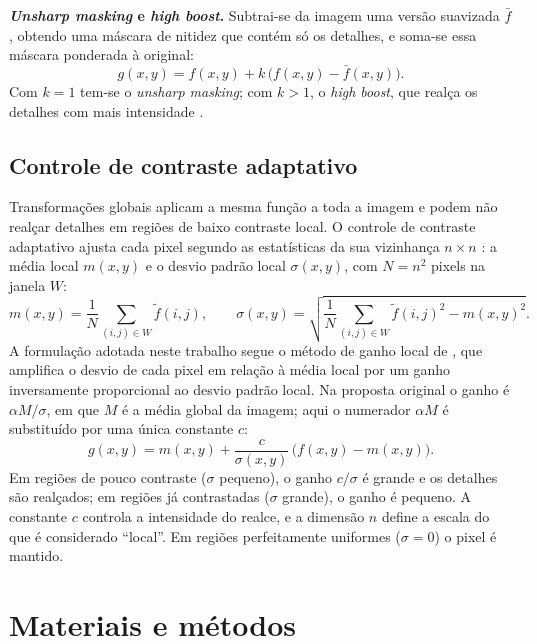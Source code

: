 \documentclass[11pt,a4paper]{article}
\begin{document}
\textbf{\textit{Unsharp masking} e \textit{high boost}.} Subtrai-se da imagem uma versão
suavizada $\bar f$, obtendo uma máscara de nitidez que contém só os detalhes, e soma-se essa
máscara ponderada à original:
\begin{equation}
  g(x, y) = f(x, y) + k\,\big(f(x, y) - \bar f(x, y)\big).
\end{equation}
Com $k = 1$ tem-se o \textit{unsharp masking}; com $k > 1$, o \textit{high boost}, que
realça os detalhes com mais intensidade \cite{gonzalez}.

\subsection{Controle de contraste adaptativo}

Transformações globais aplicam a mesma função a toda a imagem e podem não realçar detalhes
em regiões de baixo contraste local. O controle de contraste adaptativo ajusta cada pixel
segundo as estatísticas da sua vizinhança $n \times n$ \cite{gonzalez}: a média local
$m(x,y)$ e o desvio padrão local $\sigma(x,y)$, com $N = n^2$ pixels na janela $W$:
\begin{equation}
  m(x, y) = \frac{1}{N} \sum_{(i,j) \in W} \tilde f(i, j), \qquad
  \sigma(x, y) = \sqrt{\frac{1}{N} \sum_{(i,j) \in W} \tilde f(i, j)^2 - m(x, y)^2}.
\end{equation}
A formulação adotada neste trabalho segue o método de ganho local de \cite{narendra}, que
amplifica o desvio de cada pixel em relação à média local por um ganho inversamente
proporcional ao desvio padrão local. Na proposta original o ganho é $\alpha M / \sigma$, em que
$M$ é a média global da imagem; aqui o numerador $\alpha M$ é substituído por uma única
constante $c$:
\begin{equation}
  g(x, y) = m(x, y) + \frac{c}{\sigma(x, y)}\,\big(f(x, y) - m(x, y)\big).
\end{equation}
Em regiões de pouco contraste ($\sigma$ pequeno), o ganho $c/\sigma$ é grande e os detalhes
são realçados; em regiões já contrastadas ($\sigma$ grande), o ganho é pequeno. A constante
$c$ controla a intensidade do realce, e a dimensão $n$ define a escala do que é considerado
``local''. Em regiões perfeitamente uniformes ($\sigma = 0$) o pixel é mantido.

\section{Materiais e métodos}
\end{document}
